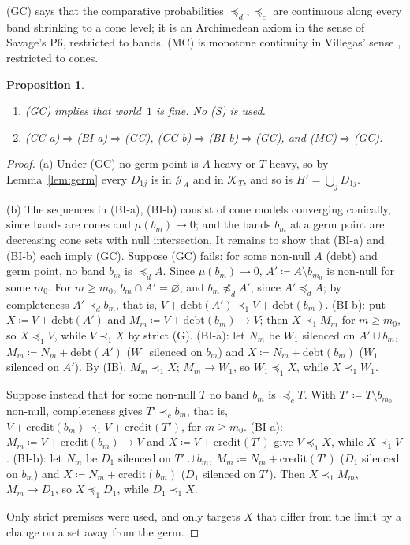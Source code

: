 \documentclass[11pt]{article}
\newtheorem{proposition}[theorem]{Proposition}
\theoremstyle{definition}\newtheorem{definition}[theorem]{Definition}
\theoremstyle{remark}\newtheorem{remark}[theorem]{Remark}
\newcommand{\debt}{\mathrm{debt}}
\newcommand{\cred}{\mathrm{credit}}
\newcommand{\Jid}{\mathcal J}
\newcommand{\Kid}{\mathcal K}
\begin{document}
(GC) says that the comparative probabilities $\preceq_d,\preceq_c$ are
continuous along every band shrinking to a cone level; it is an Archimedean
axiom in the sense of Savage's P6, restricted to bands. (MC) is monotone
continuity in Villegas' sense \cite{Villegas}, restricted to cones.

\begin{proposition}\label{prop:GC}
\begin{enumerate}[label=(\alph*)]
\item (GC) implies that world~$1$ is fine. No (S) is used.
\item (CC-a)$\Rightarrow$(BI-a)$\Rightarrow$(GC),
(CC-b)$\Rightarrow$(BI-b)$\Rightarrow$(GC), and (MC)$\Rightarrow$(GC).
\end{enumerate}
\end{proposition}
\begin{proof}
(a) Under (GC) no germ point is $A$-heavy or $T$-heavy, so by
Lemma~\ref{lem:germ} every $D_{1j}$ is in $\Jid_A$ and in $\Kid_T$, and so is
$H'=\bigcup_jD_{1j}$.

(b) The sequences in (BI-a), (BI-b) consist of cone models converging
conically, since bands are cones and $\mu(b_m)\to0$; and the bands $b_m$ at a
germ point are decreasing cone sets with null intersection. It remains to
show that (BI-a) and (BI-b) each imply (GC). Suppose (GC) fails: for some
non-null $A$ (debt) and germ point, no band $b_m$ is $\preceq_dA$. Since
$\mu(b_m)\to0$, $A'\coloneqq A\setminus b_{m_0}$ is non-null for some $m_0$.
For $m\ge m_0$, $b_m\cap A'=\varnothing$, and $b_m\not\preceq_dA'$, since
$A'\preceq_dA$; by completeness $A'\prec_db_m$, that is,
$V+\debt(A')\prec_1V+\debt(b_m)$. (BI-b): put $X\coloneqq V+\debt(A')$ and
$M_m\coloneqq V+\debt(b_m)\to V$; then $X\prec_1M_m$ for $m\ge m_0$, so
$X\preceq_1V$, while $V\prec_1X$ by strict (G). (BI-a): let $N_m$ be $W_1$
silenced on $A'\cup b_m$, $M_m\coloneqq N_m+\debt(A')$ ($W_1$ silenced on
$b_m$) and $X\coloneqq N_m+\debt(b_m)$ ($W_1$ silenced on $A'$). By (IB),
$M_m\prec_1X$; $M_m\to W_1$, so $W_1\preceq_1X$, while $X\prec_1W_1$.

Suppose instead that for some non-null $T$ no band $b_m$ is $\preceq_cT$.
With $T'\coloneqq T\setminus b_{m_0}$ non-null, completeness gives
$T'\prec_cb_m$, that is, $V+\cred(b_m)\prec_1V+\cred(T')$, for $m\ge m_0$.
(BI-a): $M_m\coloneqq V+\cred(b_m)\to V$ and $X\coloneqq V+\cred(T')$ give
$V\preceq_1X$, while $X\prec_1V$. (BI-b): let $N_m$ be $D_1$ silenced on
$T'\cup b_m$, $M_m\coloneqq N_m+\cred(T')$ ($D_1$ silenced on $b_m$) and
$X\coloneqq N_m+\cred(b_m)$ ($D_1$ silenced on $T'$). Then $X\prec_1M_m$,
$M_m\to D_1$, so $X\preceq_1D_1$, while $D_1\prec_1X$.

Only strict premises were used, and only targets $X$ that differ from the
limit by a change on a set away from the germ.
\end{proof}
\end{document}
